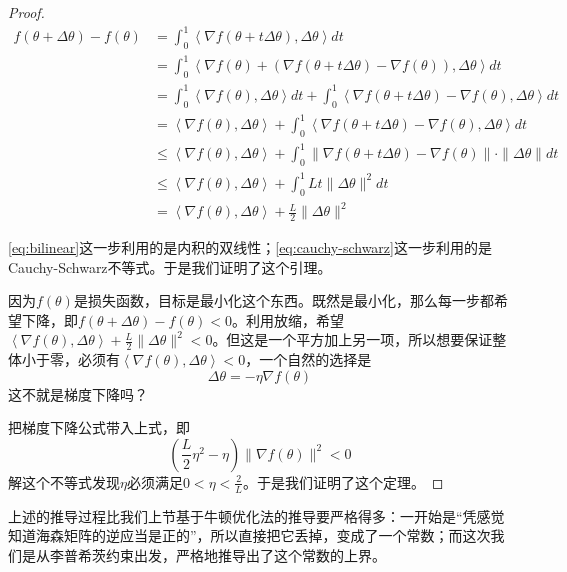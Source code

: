 \begin{proof}
    \begin{align}
        f(\theta+\Delta \theta) - f(\theta) &= \int_0^1 \left\langle\nabla f(\theta + t\Delta \theta), \Delta \theta \right\rangle dt \\
        &= \int_0^1 \left\langle\nabla f(\theta) + (\nabla f(\theta + t\Delta \theta) - \nabla f(\theta)), \Delta \theta \right\rangle dt \\
        &= \int_0^1 \left\langle\nabla f(\theta), \Delta \theta \right\rangle dt + \int_0^1 \left\langle\nabla f(\theta + t\Delta \theta) - \nabla f(\theta), \Delta \theta \right\rangle dt \label{eq:bilinear} \\
        &= \left\langle\nabla f(\theta), \Delta \theta \right\rangle + \int_0^1 \left\langle\nabla f(\theta + t\Delta \theta) - \nabla f(\theta), \Delta \theta \right\rangle dt \\
        &\leq \left\langle\nabla f(\theta), \Delta \theta \right\rangle + \int_0^1 \|\nabla f(\theta + t\Delta \theta) - \nabla f(\theta)\| \cdot \|\Delta \theta\| dt \label{eq:cauchy-schwarz}\\
        &\leq \left\langle\nabla f(\theta), \Delta \theta \right\rangle + \int_0^1 L t \|\Delta \theta\|^2 dt \\
        &= \left\langle\nabla f(\theta), \Delta \theta \right\rangle + \frac{L}{2}\|\Delta \theta\|^2
    \end{align}

    \eqref{eq:bilinear}这一步利用的是内积的双线性；\eqref{eq:cauchy-schwarz}这一步利用的是Cauchy-Schwarz不等式。于是我们证明了这个引理。

    因为$f(\theta)$是损失函数，目标是最小化这个东西。既然是最小化，那么每一步都希望下降，即$f(\theta+\Delta \theta)- f(\theta) < 0$。利用放缩，希望$\left\langle\nabla f(\theta), \Delta \theta \right\rangle + \frac{L}{2}\|\Delta \theta\|^2 < 0$。但这是一个平方加上另一项，所以想要保证整体小于零，必须有$\left\langle\nabla f(\theta), \Delta \theta \right\rangle<0$，一个自然的选择是
    \[\Delta \theta = -\eta \nabla f(\theta)\]
    这不就是梯度下降吗？

    把梯度下降公式带入上式，即
    \[ \left(\frac{L}{2}\eta^2 - \eta\right)\|\nabla f(\theta)\|^2 < 0 \]
    解这个不等式发现$\eta$必须满足$0 < \eta < \frac{2}{L}$。于是我们证明了这个定理。
\end{proof}

上述的推导过程比我们上节基于牛顿优化法的推导要严格得多：一开始是“凭感觉知道海森矩阵的逆应当是正的”，所以直接把它丢掉，变成了一个常数；而这次我们是从李普希茨约束出发，严格地推导出了这个常数的上界。

